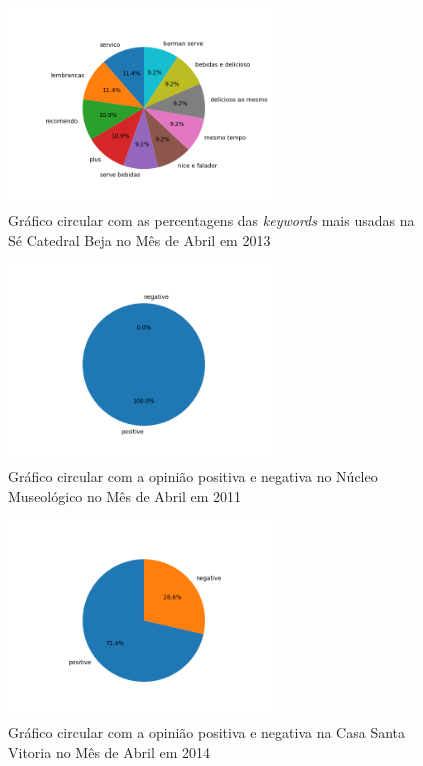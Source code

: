 \begin{figure}[!htb]
\centering
\includegraphics[width=7cm]{figuras/Graficos_Circulares_keyword/circular_keywords_abril_of_2013_at_business39.png}
\caption{Gráfico circular com as percentagens das \textit{keywords} mais usadas na Sé Catedral Beja no Mês de Abril em 2013}
\label{fig:exemplofig}
\end{figure}

\begin{figure}[!htb]
\centering
\includegraphics[width=7cm]{figuras/graficos_circulares_sent/circular_sentiment_abril_of_2011_at_business33.png}
\caption{Gráfico circular com a opinião positiva e negativa no Núcleo Museológico no Mês de Abril em 2011}
\label{fig:exemplofig}
\end{figure}

\begin{figure}[!htb]
\centering
\includegraphics[width=7cm]{figuras/graficos_circulares_sent/circular_sentiment_abril_of_2014_at_business34.png}
\caption{Gráfico circular com a opinião positiva e negativa na Casa Santa Vitoria no Mês de Abril em 2014}
\label{fig:exemplofig}
\end{figure}